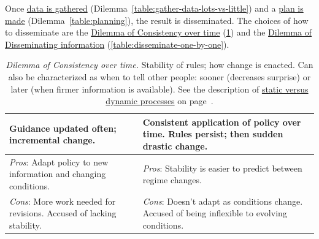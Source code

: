 

Once \hyperref[table:gather-data-lots-vs-little]{data is gathered} (Dilemma~\ref{table:gather-data-lots-vs-little}) and a \hyperref[table:planning]{plan is made} (Dilemma~\ref{table:planning}), the result is disseminated. The choices of how to disseminate are the \hyperref[table:consistency]{Dilemma of Consistency over time} (\ref{table:consistency}) and the \hyperref[table:disseminate-one-by-one]{Dilemma of Disseminating information} (\ref{table:disseminate-one-by-one}).

\begin{center}
\begin{table}[H] %
\begin{tabular}{ | m{\dilemmatablewidth}| m{\dilemmatablewidth} | } 
  \hline
  \textbf{Guidance updated often; incremental change.} & 
  \textbf{Consistent application of policy over time. Rules persist; then sudden drastic change.} \\ 
  \hline
  \textit{Pros}: Adapt policy to new information and changing conditions. &
  \textit{Pros}: Stability is easier to predict between regime changes.  \\
  \hline
  \textit{Cons}: More work needed for revisions. Accused of lacking stability. & 
  \textit{Cons}: Doesn't adapt as conditions change. Accused of being inflexible to evolving conditions. \\
  \hline
\end{tabular}
\caption{
\textit{Dilemma of Consistency over time.} 
Stability of rules; how change is enacted. Can also be characterized as when to tell other people: sooner (decreases surprise) or later (when firmer information is available).
See the description of 
\hyperref[sec:static-dynamic-processes]{static versus dynamic processes} on page~\pageref{sec:static-dynamic-processes}.
}
\label{table:consistency}
\end{table}
\end{center}

